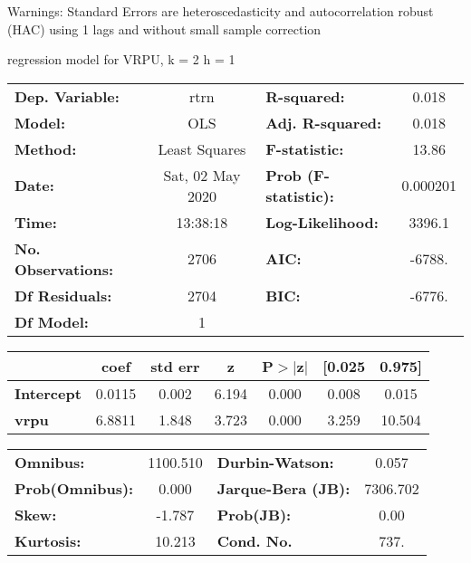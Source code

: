 Warnings: \newline
 [1] Standard Errors are heteroscedasticity and autocorrelation robust (HAC) using 1 lags and without small sample correction\ 

regression model for VRPU, k = 2 h = 1\begin{center}
\begin{tabular}{lclc}
\toprule
\textbf{Dep. Variable:}    &       rtrn       & \textbf{  R-squared:         } &     0.018   \\
\textbf{Model:}            &       OLS        & \textbf{  Adj. R-squared:    } &     0.018   \\
\textbf{Method:}           &  Least Squares   & \textbf{  F-statistic:       } &     13.86   \\
\textbf{Date:}             & Sat, 02 May 2020 & \textbf{  Prob (F-statistic):} &  0.000201   \\
\textbf{Time:}             &     13:38:18     & \textbf{  Log-Likelihood:    } &    3396.1   \\
\textbf{No. Observations:} &        2706      & \textbf{  AIC:               } &    -6788.   \\
\textbf{Df Residuals:}     &        2704      & \textbf{  BIC:               } &    -6776.   \\
\textbf{Df Model:}         &           1      & \textbf{                     } &             \\
\bottomrule
\end{tabular}
\begin{tabular}{lcccccc}
                   & \textbf{coef} & \textbf{std err} & \textbf{z} & \textbf{P$> |$z$|$} & \textbf{[0.025} & \textbf{0.975]}  \\
\midrule
\textbf{Intercept} &       0.0115  &        0.002     &     6.194  &         0.000        &        0.008    &        0.015     \\
\textbf{vrpu}      &       6.8811  &        1.848     &     3.723  &         0.000        &        3.259    &       10.504     \\
\bottomrule
\end{tabular}
\begin{tabular}{lclc}
\textbf{Omnibus:}       & 1100.510 & \textbf{  Durbin-Watson:     } &    0.057  \\
\textbf{Prob(Omnibus):} &   0.000  & \textbf{  Jarque-Bera (JB):  } & 7306.702  \\
\textbf{Skew:}          &  -1.787  & \textbf{  Prob(JB):          } &     0.00  \\
\textbf{Kurtosis:}      &  10.213  & \textbf{  Cond. No.          } &     737.  \\
\bottomrule
\end{tabular}
\end{center}

